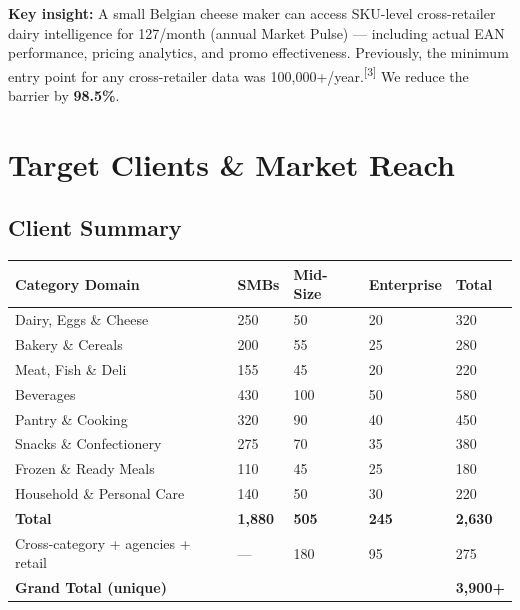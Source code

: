 \documentclass[11pt,a4paper]{article}
\begin{document}
\begin{alertbox}
\textbf{Key insight:} A small Belgian cheese maker can access SKU-level cross-retailer dairy intelligence for \texteuro{}127/month (annual Market Pulse) --- including actual EAN performance, pricing analytics, and promo effectiveness. Previously, the minimum entry point for any cross-retailer data was \texteuro{}100,000+/year.\textsuperscript{[3]} We reduce the barrier by \textbf{98.5\%}.
\end{alertbox}

\clearpage

\section{Target Clients \& Market Reach}

\subsection{Client Summary}

\begin{center}
\renewcommand{\arraystretch}{1.35}
\begin{tabularx}{\textwidth}{L{4cm} R{2cm} R{2cm} R{2cm} R{2cm}}
\toprule
{}
\textbf{\color{white}Category Domain} & \textbf{\color{white}SMBs} & \textbf{\color{white}Mid-Size} & \textbf{\color{white}Enterprise} & \textbf{\color{white}Total} \\
\midrule
Dairy, Eggs \& Cheese & 250 & 50 & 20 & 320 \\
Bakery \& Cereals & 200 & 55 & 25 & 280 \\
Meat, Fish \& Deli & 155 & 45 & 20 & 220 \\
Beverages & 430 & 100 & 50 & 580 \\
Pantry \& Cooking & 320 & 90 & 40 & 450 \\
Snacks \& Confectionery & 275 & 70 & 35 & 380 \\
Frozen \& Ready Meals & 110 & 45 & 25 & 180 \\
Household \& Personal Care & 140 & 50 & 30 & 220 \\
\midrule
\textbf{Total} & \textbf{1,880} & \textbf{505} & \textbf{245} & \textbf{2,630} \\
\midrule
{}
Cross-category + agencies + retail & --- & 180 & 95 & 275 \\
\midrule
\textbf{Grand Total (unique)} & & & & \textbf{3,900+} \\
\bottomrule
\end{tabularx}
\end{center}
\end{document}
